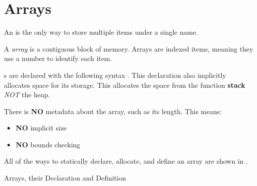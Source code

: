 \section{Arrays}\label{sec:Arrays}
An  is the only way to store multiple items under a single name.

\begin{definition}[Array]\label{def:Array}
  A \emph{array} is a contiguous block of memory.
  Arrays are indexed items, meaning they use a number to identify each item.
\end{definition}

s are declared with the following syntax .
This declaration also implicitly allocates space for its storage.
This allocates the space from the function \textbf{stack} \textit{NOT} the heap.

There is \textbf{NO} metadata about the array, such as its length.
This means:
\begin{itemize}[noitemsep]
\item \textbf{NO} implicit size
\item \textbf{NO} bounds checking
\end{itemize}

All of the ways to statically declare, allocate, and define an array are shown in .

\begin{listing}[h!tbp]
\caption{Arrays, their Declaration and Definition}
\label{lst:Arrays}
\end{listing}


